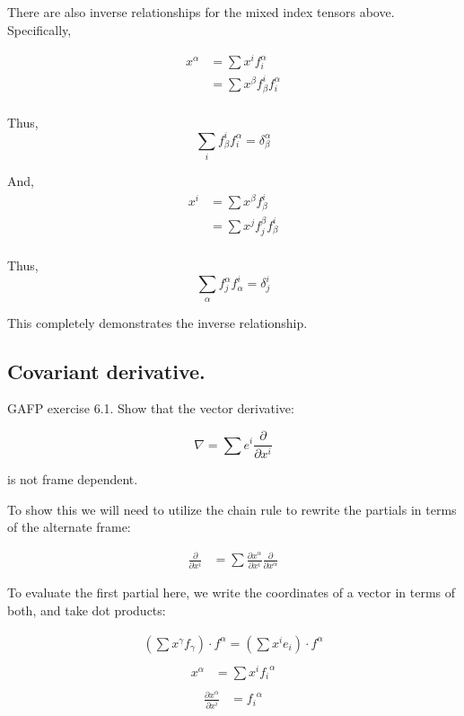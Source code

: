\documentclass{article}      %
\begin{document}
There are also inverse relationships for the mixed index tensors above.  Specifically, 

\begin{align*}
x^{\alpha} 
&= \sum x^i f_i^{\alpha} \\
&= \sum x^{\beta} f_{\beta}^i f_i^{\alpha} \\
\end{align*}

Thus,
\begin{equation}
\sum_i f_{\beta}^i f_i^{\alpha} = \delta_{\beta}^{\alpha}
\end{equation}

And,
\begin{align*}
x^{i} 
&= \sum x^{\beta} f_{\beta}^i \\
&= \sum x^{j} f_j^{\beta} f_{\beta}^i \\
\end{align*}

Thus,
\begin{equation}
\sum_{\alpha} f_j^{\alpha} f_{\alpha}^i = \delta_j^i
\end{equation}

This completely demonstrates the inverse relationship.

\subsection{ Covariant derivative. }

GAFP exercise 6.1.  Show that the vector derivative:

\begin{equation}
\nabla = \sum e^i \frac{\partial}{\partial x^i}
\end{equation}

is not frame dependent.

To show this we will need to utilize the chain rule to rewrite the partials in terms of the alternate frame:

\begin{align*}
\frac{\partial}{\partial x^i} &= \sum \frac{\partial x^\alpha}{\partial x^i} \frac{\partial}{\partial x^\alpha} 
\end{align*}

To evaluate the first partial here, we write the coordinates of a vector in terms of both, and take dot products:

\begin{align*}
\left(\sum x^{\gamma} f_{\gamma}\right) \cdot f^{\alpha} = \left(\sum x^i e_i\right) \cdot f^{\alpha} \\
\end{align*}
\begin{align*}
x^{\alpha} &= \sum x^i {f_i}^{\alpha} \\
\end{align*}
\begin{align*}
\frac{\partial x^{\alpha}}{\partial x^i} &= {f_i}^{\alpha}
\end{align*}
\end{document}
